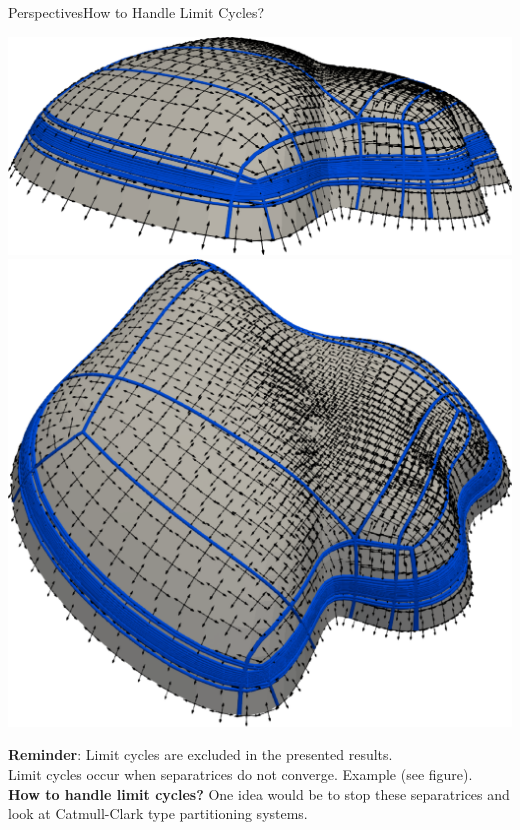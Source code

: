 \documentclass[compress,10pt,aspectratio=169]{beamer}
\begin{document}
\begin{frame}{Perspectives}{How to Handle Limit Cycles?}
\small
\vspace{-0.5cm}
\begin{center}
\includegraphics[scale=0.15]{images/cycle_limit_1.pdf}\hspace{0.8cm}
\includegraphics[scale=0.15]{images/cycle_limit_2.pdf}
\end{center}
\textbf{Reminder}: Limit cycles are excluded in the presented results.\\\vspace{0.1cm}
Limit cycles occur when separatrices do not converge. Example (see figure).\\\vspace{0.1cm}
\textbf{How to handle limit cycles?} One idea would be to stop these separatrices and look at Catmull-Clark type partitioning systems.
\end{frame}
\end{document}
